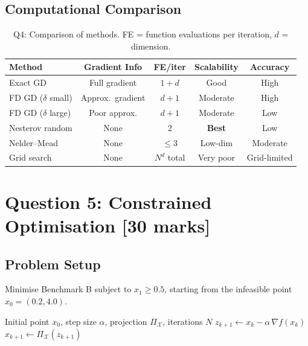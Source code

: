 \documentclass[11pt,a4paper]{article}
\begin{document}
\subsection{Computational Comparison}

\begin{table}[H]
\centering
\caption{Q4: Comparison of methods. FE = function evaluations per iteration, $d$ = dimension.}
\label{tab:q4_comparison}
\begin{tabular}{lcccc}
\toprule
\textbf{Method} & \textbf{Gradient Info} & \textbf{FE/iter} & \textbf{Scalability} & \textbf{Accuracy} \\
\midrule
Exact GD & Full gradient & $1 + d$ & Good & High \\
FD GD ($\delta$ small) & Approx.\ gradient & $d + 1$ & Moderate & High \\
FD GD ($\delta$ large) & Poor approx. & $d + 1$ & Moderate & Low \\
Nesterov random & None & 2 & \textbf{Best} & Low \\
Nelder--Mead & None & $\leq 3$ & Low-dim & Moderate \\
Grid search & None & $N^d$ total & Very poor & Grid-limited \\
\bottomrule
\end{tabular}
\end{table}

\section{Question 5: Constrained Optimisation \hfill [30 marks]}
\label{sec:q5}

\subsection{Problem Setup}

Minimise Benchmark B subject to $x_1 \geq 0.5$, starting from the infeasible point $x_0 = (0.2, 4.0)$.

\begin{algorithm}[H]
\caption{Projected Gradient Descent}
\label{alg:pgd}
\begin{algorithmic}[1]
\Require Initial point $x_0$, step size $\alpha$, projection $\Pi_{\mathcal{X}}$, iterations $N$
    \State $z_{k+1} \gets x_k - \alpha\, \nabla f(x_k)$ 
    \State $x_{k+1} \gets \Pi_{\mathcal{X}}(z_{k+1})$ 
\EndFor
\end{algorithmic}
\end{algorithm}
\end{document}
